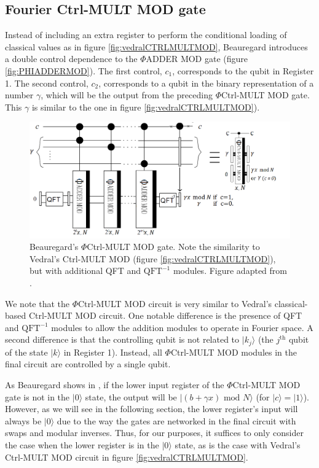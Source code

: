 \documentclass{article}
\begin{document}
\subsection{Fourier Ctrl-MULT MOD gate}
Instead of including an extra register to perform the conditional loading of classical values as in figure \ref{fig:vedralCTRLMULTMOD}, Beauregard introduces a double control dependence to the $\Phi$ADDER MOD gate (figure \ref{fig:PHIADDERMOD}). The first control, $c_1$, corresponds to the qubit in Register 1. The second control, $c_2$,  corresponds to a qubit in the binary representation of a number $\gamma$, which will be the output from the preceding $\Phi$Ctrl-MULT MOD gate. This $\gamma$ is similar to the one in figure \ref{fig:vedralCTRLMULTMOD}). 
\begin{figure}[!htbp]
\centering
\includegraphics[width=1\textwidth]
{PHICTRLMULTMOD.png}
\captionsetup{format = hang}
\caption{Beauregard's $\Phi$Ctrl-MULT MOD gate. Note the similarity to Vedral's Ctrl-MULT MOD (figure \ref{fig:vedralCTRLMULTMOD}), but with additional QFT and $\text{QFT}^{-1}$ modules.  
Figure adapted from \cite{Bea03}.}
\label{fig:PHICTRLMULTMOD}
\end{figure}

We note that the $\Phi$Ctrl-MULT MOD circuit is very similar to Vedral's classical-based Ctrl-MULT MOD circuit. One notable difference is the presence of QFT and $\text{QFT}^{-1}$ modules to allow the addition modules to operate in Fourier space. A second difference is that the controlling qubit is not related to $|k_j\rangle$ (the $j^{\text{th}}$ qubit of the  state $|k\rangle$ in Register 1). Instead, all $\Phi$Ctrl-MULT MOD modules in the final circuit are controlled by a single qubit.

As Beauregard shows in \cite{Bea03}, if the lower input register of the $\Phi$Ctrl-MULT MOD gate is not in the $|0\rangle$ state, the output will be $|(b+\gamma x) \text{ mod }N\rangle$ (for $|c\rangle=|1\rangle$). However, as we will see in the following section, the lower register's input will always be $|0\rangle$ due to the way the gates are networked in the final circuit with swaps and modular inverses. Thus, for our purposes, it suffices to only consider the case when the lower register is in the $|0\rangle$ state, as is the case with Vedral's Ctrl-MULT MOD circuit in figure \ref{fig:vedralCTRLMULTMOD}. 
\end{document}
